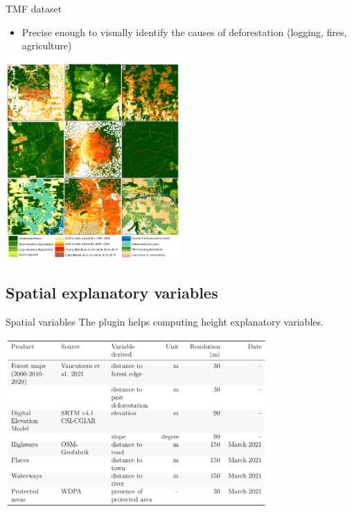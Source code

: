 \documentclass[10pt,table,dvipsnames,compress]{beamer}
\begin{document}
\begin{frame}[label={sec:orgae8b85b}]{TMF dataset}
\begin{itemize}
\item Precise enough to visually identify the causes of deforestation
(logging, fires, agriculture)
\end{itemize}

\begin{center}
\includegraphics[width=0.5\textwidth]{figs/Vancutsem2021-patterns.png}
\end{center}
\end{frame}

\subsection{Spatial explanatory variables}
\label{sec:org75f280d}

\begin{frame}[label={sec:orgaac5087}]{Spatial variables}
The plugin helps computing height explanatory variables.

\begin{center}
\includegraphics[width=0.75\textwidth]{figs/variables-tab.png}
\end{center}
\end{frame}
\end{document}

